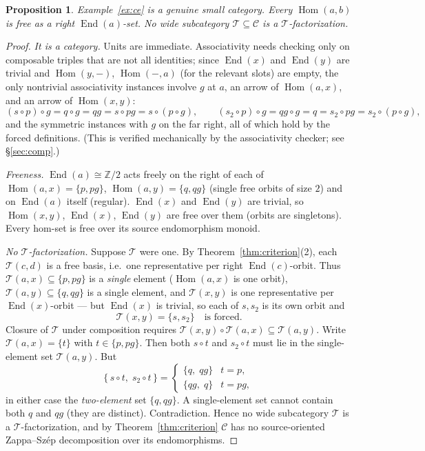 \documentclass[11pt]{article}
\newtheorem{proposition}[theorem]{Proposition}
\theoremstyle{definition}
\newcommand{\Hom}{\operatorname{Hom}}
\newcommand{\End}{\operatorname{End}}
\newcommand{\C}{\mathcal{C}}
\newcommand{\T}{\mathcal{T}}
\begin{document}
\begin{proposition}\label{prop:ce}
Example~\ref{ex:ce} is a genuine small category. Every $\Hom(a,b)$ is free as a
right $\End(a)$-set. No wide subcategory $\T\subseteq\C$ is a $\T$-factorization.
\end{proposition}

\begin{proof}
\emph{It is a category.} Units are immediate. Associativity needs checking only
on composable triples that are not all identities; since $\End(x)$ and $\End(y)$
are trivial and $\Hom(y,-)$, $\Hom(-,a)$ (for the relevant slots) are empty, the
only nontrivial associativity instances involve $g$ at $a$, an arrow of
$\Hom(a,x)$, and an arrow of $\Hom(x,y)$:
\[
  (s\circ p)\circ g=q\circ g=qg=s\circ pg=s\circ(p\circ g),\qquad
  (s_2\circ p)\circ g=qg\circ g=q=s_2\circ pg=s_2\circ(p\circ g),
\]
and the symmetric instances with $g$ on the far right, all of which hold by the
forced definitions. (This is verified mechanically by the associativity checker;
see \S\ref{sec:comp}.)

\emph{Freeness.} $\End(a)\cong\mathbb Z/2$ acts freely on the right of each of
$\Hom(a,x)=\{p,pg\}$, $\Hom(a,y)=\{q,qg\}$ (single free orbits of size $2$) and on
$\End(a)$ itself (regular). $\End(x)$ and $\End(y)$ are trivial, so $\Hom(x,y)$,
$\End(x)$, $\End(y)$ are free over them (orbits are singletons). Every hom-set is
free over its source endomorphism monoid.

\emph{No $\T$-factorization.} Suppose $\T$ were one. By
Theorem~\ref{thm:criterion}(2), each $\T(c,d)$ is a free basis, i.e.\ one
representative per right $\End(c)$-orbit. Thus $\T(a,x)\subseteq\{p,pg\}$ is a
\emph{single} element ($\Hom(a,x)$ is one orbit), $\T(a,y)\subseteq\{q,qg\}$ is a
single element, and $\T(x,y)$ is one representative per $\End(x)$-orbit --- but
$\End(x)$ is trivial, so each of $s,s_2$ is its own orbit and
\[
  \T(x,y)=\{s,s_2\}\quad\text{is forced.}
\]
Closure of $\T$ under composition requires $\T(x,y)\circ\T(a,x)\subseteq\T(a,y)$.
Write $\T(a,x)=\{t\}$ with $t\in\{p,pg\}$. Then both $s\circ t$ and $s_2\circ t$
must lie in the single-element set $\T(a,y)$. But
\[
  \{\,s\circ t,\;s_2\circ t\,\}=
  \begin{cases}\{q,\;qg\} & t=p,\\[2pt]\{qg,\;q\} & t=pg,\end{cases}
\]
in either case the \emph{two-element} set $\{q,qg\}$. A single-element set cannot
contain both $q$ and $qg$ (they are distinct). Contradiction. Hence no wide
subcategory $\T$ is a $\T$-factorization, and by Theorem~\ref{thm:criterion} $\C$
has no source-oriented Zappa--Sz\'ep decomposition over its endomorphisms.
\end{proof}
\end{document}
